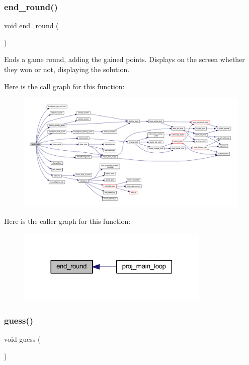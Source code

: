 \subsubsection{\texorpdfstring{end\+\_\+round()}{end\_round()}}
{\footnotesize\ttfamily void end\+\_\+round (\begin{DoxyParamCaption}{ }\end{DoxyParamCaption})}



Ends a game round, adding the gained points. Displays on the screen whether they won or not, displaying the solution. 

Here is the call graph for this function\+:\nopagebreak
\begin{figure}[H]
\begin{center}
\leavevmode
\includegraphics[width=350pt]{group__pengoo_gaf06af764d8b387c19edc38c0effd1115_cgraph}
\end{center}
\end{figure}
Here is the caller graph for this function\+:\nopagebreak
\begin{figure}[H]
\begin{center}
\leavevmode
\includegraphics[width=260pt]{group__pengoo_gaf06af764d8b387c19edc38c0effd1115_icgraph}
\end{center}
\end{figure}
\mbox{\label{group__pengoo_ga089d0f37444b1b486cf98045a512deed}} 
\subsubsection{\texorpdfstring{guess()}{guess()}}
{\footnotesize\ttfamily void guess (\begin{DoxyParamCaption}{ }\end{DoxyParamCaption})}




